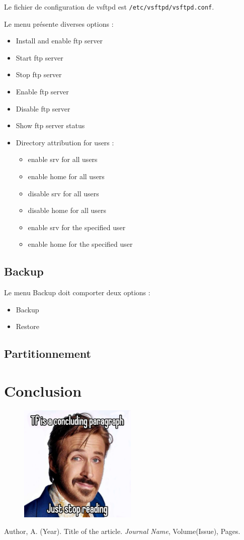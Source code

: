 \documentclass{article}
\begin{document}
	Le fichier de configuration de vsftpd est \texttt{/etc/vsftpd/vsftpd.conf}.
	
	
	Le menu présente diverses options :
	\begin{itemize}
		\item Install and enable ftp server
		\item Start ftp server 
		\item Stop ftp server
		\item Enable ftp server
		\item Disable ftp server 
		\item Show ftp server status
		\item Directory attribution for users :
		\begin{itemize}
			\item enable srv for all users
			\item enable home for all users
			\item  disable srv for all users
			\item disable home for all users
			\item enable srv for the specified user
			\item enable home for the specified user
		\end{itemize}
	\end{itemize}
	
	\newpage
	
	\subsection{Backup}
	Le menu Backup doit comporter deux options :
	\begin{itemize}
		\item Backup
		\item Restore
	\end{itemize}
	
	\newpage
	
	\subsection{Partitionnement}
	
	\newpage
	\section{Conclusion}


	\begin{figure}[h]
		\centering
		\includegraphics[width=0.5\textwidth]{gosling.png}
		
		\label{fig:gosling}
	\end{figure}
	

	\begin{thebibliography}{9}
		Author, A. (Year). Title of the article. \textit{Journal Name}, Volume(Issue), Pages.
	\end{thebibliography}
\end{document}
